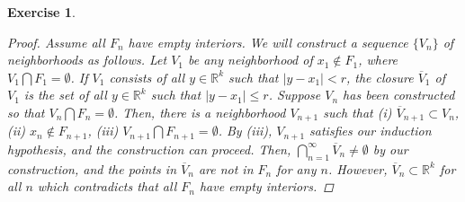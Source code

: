 \documentclass[10pt,letterpaper]{amsart}
\newtheorem{exercise}{Exercise}[section]
\theoremstyle{definition}
\theoremstyle{remark}
\numberwithin{equation}{exercise}
\begin{document}
\begin{multicols}{2}
\begin{exercise}
\begin{proof}
      Assume all $F_n$ have empty interiors. We will construct a sequence $\{V_n\}$ of neighborhoods as follows. Let $V_1$ be any neighborhood of $x_1 \notin F_1$, where $V_1 \bigcap F_1 = \emptyset$. If $V_1$ consists of all $y \in \mathbb{R}^k$ such that $|y-x_1| < r$, the closure $\overline{V}_1$ of $V_1$ is the set of all $y \in \mathbb{R}^k$ such that $|y-x_1| \le r$. Suppose $V_n$ has been constructed so that $V_n \bigcap F_n = \emptyset$. Then, there is a neighborhood $V_{n+1}$ such that (i) $\overline{V}_{n+1} \subset V_n$, (ii) $x_n \notin F_{n+1}$, (iii) $V_{n+1} \bigcap F_{n+1} = \emptyset$. By (iii), $V_{n+1}$ satisfies our induction hypothesis, and the construction can proceed. Then, $\bigcap^\infty_{n=1} \overline{V}_n \neq \emptyset$ by our construction, and the points in $\overline{V}_n$ are not in $F_n$ for any $n$. However, $\overline{V}_n \subset \mathbb{R}^k$ for all $n$ which contradicts that all $F_n$ have empty interiors.
    \end{proof}
  \end{exercise}

\end{multicols}
\end{document}
